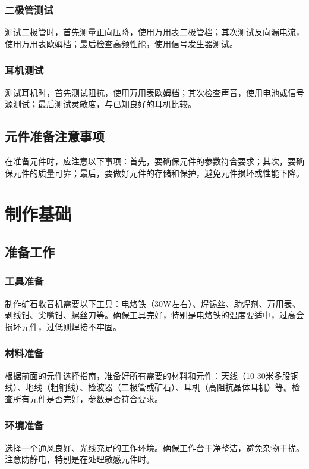 \documentclass[12pt,UTF8]{ctexbook}
\begin{document}
\subsubsection{二极管测试}
测试二极管时，首先测量正向压降，使用万用表二极管档；其次测试反向漏电流，使用万用表欧姆档；最后检查高频性能，使用信号发生器测试。

\subsubsection{耳机测试}
测试耳机时，首先测试阻抗，使用万用表欧姆档；其次检查声音，使用电池或信号源测试；最后测试灵敏度，与已知良好的耳机比较。

\subsection{元件准备注意事项}

在准备元件时，应注意以下事项：首先，要确保元件的参数符合要求；其次，要确保元件的质量可靠；最后，要做好元件的存储和保护，避免元件损坏或性能下降。

\section{制作基础}

\subsection{准备工作}

\subsubsection{工具准备}
制作矿石收音机需要以下工具：电烙铁（30W左右）、焊锡丝、助焊剂、万用表、剥线钳、尖嘴钳、螺丝刀等。确保工具完好，特别是电烙铁的温度要适中，过高会损坏元件，过低则焊接不牢固。

\subsubsection{材料准备}
根据前面的元件选择指南，准备好所有需要的材料和元件：天线（10-30米多股铜线）、地线（粗铜线）、检波器（二极管或矿石）、耳机（高阻抗晶体耳机）等。检查所有元件是否完好，参数是否符合要求。

\subsubsection{环境准备}
选择一个通风良好、光线充足的工作环境。确保工作台干净整洁，避免杂物干扰。注意防静电，特别是在处理敏感元件时。
\end{document}
